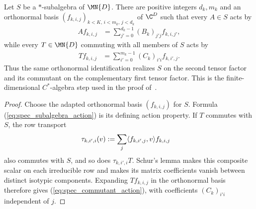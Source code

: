 \begin{theorem}%
    \label{thm:starSubalgebra_complementary_spatial_actions}
    \leanok
    Let $S$ be a $*$-subalgebra of $\MN{D}$. There are positive integers
    $d_k,m_k$ and an orthonormal basis
    $(f_{k,i,j})_{k<K,\,i<m_k,\,j<d_k}$ of $\C^D$ such that every $A\in S$
    acts by
    \begin{align}
        A f_{k,i,j}
        &=\sum_{j'=0}^{d_k-1}(B_k)_{j'j}f_{k,i,j'},
        \label{eq:spec_subalgebra_action}
    \end{align}
    while every $T\in\MN{D}$ commuting with all members of $S$ acts by
    \begin{align}
        T f_{k,i,j}
        &=\sum_{i'=0}^{m_k-1}(C_k)_{i'i}f_{k,i',j}.
        \label{eq:spec_commutant_action}
    \end{align}
    Thus the same orthonormal identification realizes $S$ on the second
    tensor factor and its commutant on the complementary first tensor
    factor. This is the finite-dimensional $C^*$-algebra step used in the
    proof of~\cite[Lemma~2.1]{Beigi2012Classification}.
\end{theorem}

\begin{proof}
    \leanok
    Choose the adapted orthonormal basis $(f_{k,i,j})$ for $S$.
    Formula (\ref{eq:spec_subalgebra_action}) is its defining action
    property. If $T$ commutes with $S$, the row transport
    \begin{align}
        \tau_{k,i',i}(v)
        &:=\sum_j\langle f_{k,i',j},v\rangle f_{k,i,j}
        \notag
    \end{align}
    also commutes with $S$, and so does $\tau_{k,i',i}T$. Schur's lemma
    makes this composite scalar on each irreducible row and makes its matrix
    coefficients vanish between distinct isotypic components. Expanding
    $Tf_{k,i,j}$ in the orthonormal basis therefore gives
    (\ref{eq:spec_commutant_action}), with coefficients
    $(C_k)_{i'i}$ independent of $j$.
\end{proof}

